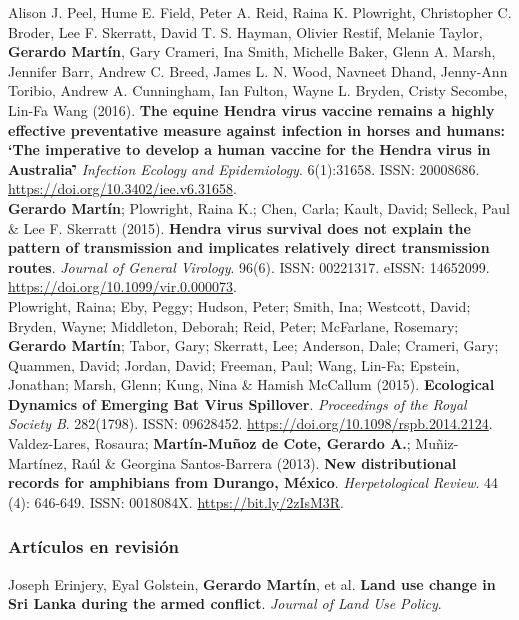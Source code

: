 \documentclass[11pt, letter]{article}
\newcommand{\years}[1]{\marginnote{\scriptsize #1}}
\begin{document}
\years{2016} Alison J. Peel, Hume E. Field, Peter A. Reid, Raina K. Plowright, Christopher C. Broder, Lee F. Skerratt, David T. S. Hayman, Olivier Restif, Melanie Taylor, \textbf{Gerardo Mart\'in}, Gary Crameri, Ina Smith, Michelle Baker, Glenn A. Marsh, Jennifer Barr, Andrew C. Breed, James L. N. Wood, Navneet Dhand, Jenny-Ann Toribio, Andrew A. Cunningham, Ian Fulton, Wayne L. Bryden, Cristy Secombe, Lin-Fa Wang (2016). \textbf{The equine Hendra virus vaccine remains a highly effective preventative measure against infection in horses and humans: \lq The imperative to develop a human vaccine for the Hendra virus in Australia\rq\.} \emph{Infection Ecology and Epidemiology}. 6(1):31658. ISSN: 20008686. \url{https://doi.org/10.3402/iee.v6.31658}.\\

\years{2015} \textbf{Gerardo Mart\'in}; Plowright, Raina K.; Chen, Carla; Kault, David; Selleck, Paul \& Lee F. Skerratt (2015). \textbf{Hendra virus survival does not explain the pattern of transmission and implicates relatively direct transmission routes}. \emph{Journal of General Virology}. 96(6). ISSN: 00221317. eISSN: 14652099. \url{https://doi.org/10.1099/vir.0.000073}.\\

\years{2015} Plowright, Raina; Eby, Peggy; Hudson, Peter; Smith, Ina; Westcott, David; Bryden, Wayne; Middleton, Deborah; Reid, Peter; McFarlane, Rosemary; \textbf{Gerardo Mart\'in}; Tabor, Gary; Skerratt, Lee; Anderson, Dale; Crameri, Gary; Quammen, David; Jordan, David; Freeman, Paul; Wang, Lin-Fa; Epstein, Jonathan; Marsh, Glenn; Kung, Nina \& Hamish McCallum (2015). \textbf{Ecological Dynamics of Emerging Bat Virus Spillover}. \emph{Proceedings of the Royal Society B}.  282(1798). ISSN: 09628452. \url{https://doi.org/10.1098/rspb.2014.2124}.\\

\years{2013} Valdez-Lares, Rosaura; \textbf{Mart\'in-Mu\~noz de Cote, Gerardo A.}; Mu\~niz-Mart\'inez, Ra\'ul \& Georgina Santos-Barrera (2013). \textbf{New distributional records for amphibians from Durango, M\'exico}. \emph{Herpetological Review}. 44 (4): 646-649. ISSN: 0018084X. \url{https://bit.ly/2zIsM3R}.\\

\subsubsection*{Art\'iculos en revisión}

\years{2022} Joseph Erinjery, Eyal Golstein, \textbf{Gerardo Mart\'in}, et al. \textbf{Land use change in Sri Lanka during the armed conflict}. \emph{Journal of Land Use Policy}. \\
\end{document}
